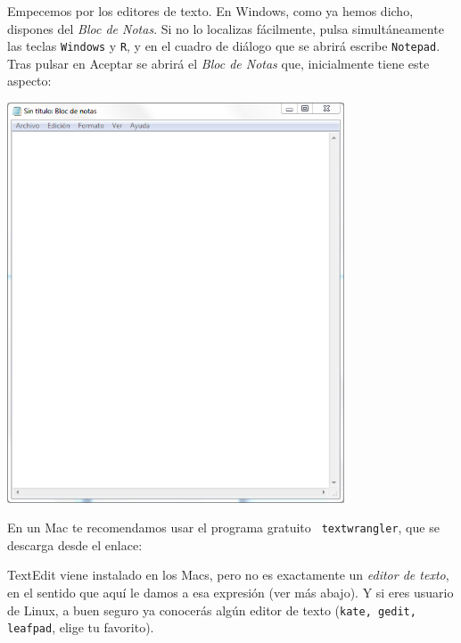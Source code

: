 \documentclass[10pt,a4paper]{article}\usepackage[]{graphicx}\usepackage[]{color}
\begin{document}
Empecemos por los editores de texto. En Windows, como ya hemos dicho, dispones del {\em Bloc de
Notas}. Si no lo localizas fácilmente, pulsa simultáneamente las teclas {\tt Windows} y {\tt R}, y
en el cuadro de diálogo que se abrirá escribe {\tt Notepad}. Tras pulsar en Aceptar se abrirá el
{\em Bloc de Notas} que, inicialmente tiene este aspecto:
\begin{center}
\includegraphics[width=10cm]{../fig/Tut00-BlocDeNotas.png}
\end{center}
En un Mac te recomendamos usar el programa gratuito {\tt
textwrangler}, que se descarga desde el enlace:
      \begin{center}
      \end{center}
TextEdit viene instalado en los Macs, pero no es exactamente un {\em editor de texto}, en el
sentido que aquí le damos a esa expresión (ver más abajo). Y si eres usuario de Linux, a buen
seguro ya conocerás algún editor de texto ({\tt kate, gedit, leafpad}, elige tu favorito).
\end{document}
